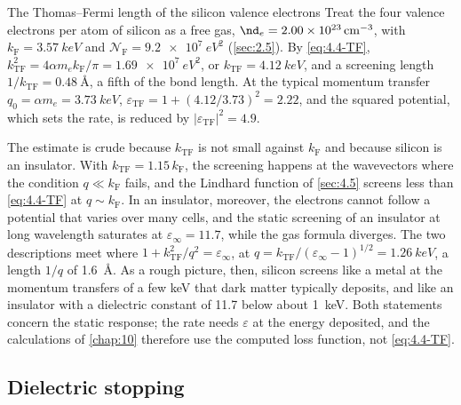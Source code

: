 \begin{workedexample}{The Thomas--Fermi length of the silicon valence electrons}\label{we:4-tf}
Treat the four valence electrons per atom of silicon as a free gas, $\nd_e = \SI{2.00e23}{cm^{-3}}$, with $k_{\mathrm{F}} = \SI{3.57}{keV}$ and $\mathcal{N}_{\mathrm{F}} = \SI{9.2e7}{eV^2}$ (\cref{sec:2.5}). By \cref{eq:4.4-TF}, $k_{\mathrm{TF}}^2 = 4\alpha m_ek_{\mathrm{F}}/\pi = \SI{1.69e7}{eV^2}$, or $k_{\mathrm{TF}} = \SI{4.12}{keV}$, and a screening length $1/k_{\mathrm{TF}} = \SI{0.48}{\angstrom}$, a fifth of the bond length. At the typical momentum transfer $q_0 = \alpha m_e = \SI{3.73}{keV}$, $\varepsilon_{\mathrm{TF}} = 1 + (4.12/3.73)^2 = 2.22$, and the squared potential, which sets the rate, is reduced by $|\varepsilon_{\mathrm{TF}}|^2 = 4.9$.

The estimate is crude because $k_{\mathrm{TF}}$ is not small against $k_{\mathrm{F}}$ and because silicon is an insulator. With $k_{\mathrm{TF}} = 1.15\,k_{\mathrm{F}}$, the screening happens at the wavevectors where the condition $q \ll k_{\mathrm{F}}$ fails, and the Lindhard function of \cref{sec:4.5} screens less than \cref{eq:4.4-TF} at $q \sim k_{\mathrm{F}}$. In an insulator, moreover, the electrons cannot follow a potential that varies over many cells, and the static screening of an insulator at long wavelength saturates at $\varepsilon_\infty = 11.7$, while the gas formula diverges. The two descriptions meet where $1 + k_{\mathrm{TF}}^2/q^2 = \varepsilon_\infty$, at $q = k_{\mathrm{TF}}/(\varepsilon_\infty - 1)^{1/2} = \SI{1.26}{keV}$, a length $1/q$ of \SI{1.6}{\angstrom}. As a rough picture, then, silicon screens like a metal at the momentum transfers of a few keV that dark matter typically deposits, and like an insulator with a dielectric constant of 11.7 below about \SI{1}{keV}. Both statements concern the static response; the rate needs $\varepsilon$ at the energy deposited, and the calculations of \cref{chap:10} therefore use the computed loss function, not \cref{eq:4.4-TF}.
\end{workedexample}

\subsection{Dielectric stopping}

